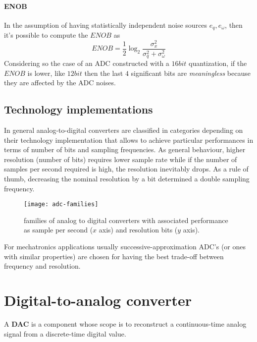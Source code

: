 			\paragraph{ENOB} In the assumption of having statistically independent noise sources $e_q,e_\omega$, then it's possible to compute the  $ENOB$ as
			\begin{equation}
				ENOB = \frac 1 2 \log_2 \frac{\sigma_x^2}{\sigma_q^2 + \sigma_\omega^2}
			\end{equation}
			Considering so the case of an ADC constructed with a $16bit$ quantization, if the $ENOB$ is lower, like $12bit$ then the last $4$ significant bits are \textit{meaningless} because they are affected by the ADC noises.
						
		\subsection{Technology implementations}
			
			In general analog-to-digital converters are classified in categories depending on their technology implementation that allows to achieve particular performances in terms of number of bits and sampling frequencies. As general behaviour, higher resolution (number of bits) requires lower sample rate while if the number of samples per second required is high, the resolution inevitably drops. As a rule of thumb, decreasing the nominal resolution by a bit determined a double sampling frequency.
			
			\begin{SCfigure}[1][bht]
				\centering
				\texttt{[image: adc-families]}
				\caption{families of analog to digital converters with associated performance as sample per second ($x$ axis) and resolution bits ($y$ axis).}
			\end{SCfigure}
		
			For mechatronics applications usually successive-approximation ADC's (or ones with similar properties) are chosen for having the best trade-off between frequency and resolution.			

\section{Digital-to-analog converter}
	
	A  \textbf{DAC} is a component whose scope is to reconstruct a continuous-time analog signal from a discrete-time digital value.
	
